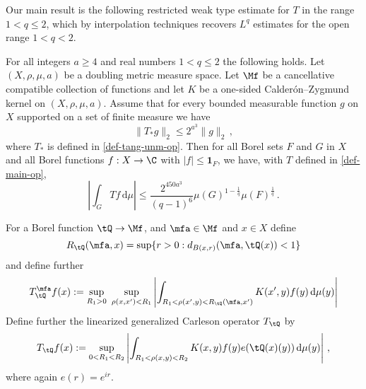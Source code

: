 Our main result is the following restricted weak type estimate for $T$ in the range $1<q\le 2$, which by interpolation techniques recovers $L^q$ estimates for the open range
$1<q<2$.
\begin{theorem}
\label{metric-space-Carleson}
\leanok
{}
    For all integers $a \ge 4$ and real numbers $1<q\le 2$
    the following holds.
    Let $(X,\rho,\mu,a)$ be a doubling metric measure space. Let $\Mf$ be a
    cancellative compatible collection of functions and let $K$ be a one-sided Calder\'on--Zygmund kernel on $(X,\rho,\mu,a)$. Assume that for every bounded measurable function $g$ on $X$ supported on a set of finite measure we have
    \begin{equation}\label{nontanbound}
        \|T_{*}g\|_{2} \leq 2^{a^3} \|g\|_2\,,
    \end{equation}
    where $T_{*}$ is defined in
\eqref{def-tang-unm-op}.
    Then for all Borel sets $F$ and $G$ in $X$ and
    all Borel functions $f:X\to \C$ with
    $|f|\le \mathbf{1}_F$, we have, with $T$ defined in \eqref{def-main-op},
    \begin{equation}
        \label{resweak}
        \left|\int_{G} T f \, \mathrm{d}\mu\right| \leq \frac{2^{450a^3}}{(q-1)^6} \mu(G)^{1-\frac{1}{q}} \mu(F)^{\frac{1}{q}}\, .
    \end{equation}
\end{theorem}

For a Borel function $\tQ\to \Mf$, and $\mfa \in \Mf$ and $x\in X$ define
\begin{equation}
    R_{\tQ}(\mfa,x)=\sup\{r>0:d_{B(x,r)}(\mfa, \tQ(x))<1\}
\end{equation}
and define further
\begin{equation}
    \label{def-lin-star-op}
    T_{\tQ}^\mfa f(x):=\sup_{R_1>0} \ \sup_{\rho(x,x')<R_1}
    \left|\int_{R_1< \rho(x',y) < R_{\tQ}(\mfa,x')} K(x',y) f(y) \, \mathrm{d}\mu(y) \right|
\end{equation}
Define further the linearized generalized Carleson operator $T_\tQ$ by
\begin{equation}
    \label{def-lin-main-op}
    T_\tQ f(x):= \sup_{0 < R_1 < R_2}\left| \int_{R_1 < \rho(x,y) < R_2} K(x,y) f(y) e(\tQ(x)(y)) \, \mathrm{d}\mu(y) \right|\, ,
\end{equation}
where again $e(r)=e^{ir}$.

